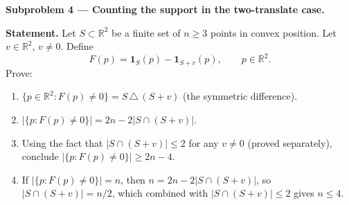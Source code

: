 \documentclass{article}
\begin{document}
\textbf{Subproblem 4 --- Counting the support in the two-translate case.}

\medskip
\textbf{Statement.}
Let $S\subset\mathbb{R}^2$ be a finite set of $n\ge 3$ points in convex position.
Let $v\in\mathbb{R}^2$, $v\neq 0$.  Define
\[
  F(p) = \mathbf{1}_S(p) - \mathbf{1}_{S+v}(p), \qquad p\in\mathbb{R}^2.
\]
Prove:
\begin{enumerate}
  \item $\{p\in\mathbb{R}^2 : F(p)\neq 0\} = S\,\triangle\,(S+v)$ (the symmetric difference).
  \item $|\{p : F(p)\neq 0\}| = 2n - 2|S\cap(S+v)|$.
  \item Using the fact that $|S\cap(S+v)|\le 2$ for any $v\neq 0$ (proved separately), conclude $|\{p:F(p)\neq 0\}|\ge 2n-4$.
  \item If $|\{p:F(p)\neq 0\}| = n$, then $n = 2n-2|S\cap(S+v)|$, so $|S\cap(S+v)|=n/2$, which combined with $|S\cap(S+v)|\le 2$ gives $n\le 4$.
\end{enumerate}
\end{document}
